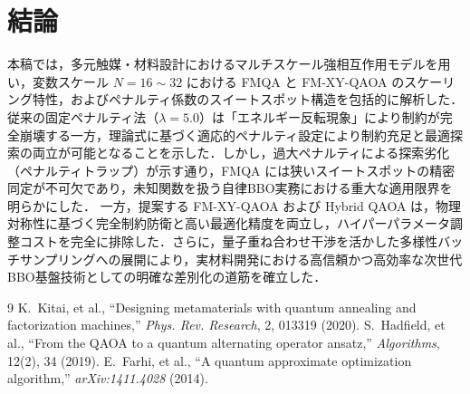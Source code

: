 \documentclass[11pt,a4paper]{ltjsarticle}
\begin{document}
\section{結論}
\label{sec:conclusion}
\vspace{-1mm}
本稿では，多元触媒・材料設計におけるマルチスケール強相互作用モデルを用い，変数スケール $N=16 \sim 32$ における FMQA と FM-XY-QAOA のスケーリング特性，およびペナルティ係数のスイートスポット構造を包括的に解析した．
従来の固定ペナルティ法（$\lambda=5.0$）は「エネルギー反転現象」により制約が完全崩壊する一方，理論式に基づく適応的ペナルティ設定により制約充足と最適探索の両立が可能となることを示した．しかし，過大ペナルティによる探索劣化（ペナルティトラップ）が示す通り，FMQA には狭いスイートスポットの精密同定が不可欠であり，未知関数を扱う自律BBO実務における重大な適用限界を明らかにした．
一方，提案する FM-XY-QAOA および Hybrid QAOA は，物理対称性に基づく完全制約防衛と高い最適化精度を両立し，ハイパーパラメータ調整コストを完全に排除した．さらに，量子重ね合わせ干渉を活かした多様性バッチサンプリングへの展開により，実材料開発における高信頼かつ高効率な次世代BBO基盤技術としての明確な差別化の道筋を確立した．

\vspace{1.5mm}
{\scriptsize
\begin{thebibliography}{9}\setlength{\itemsep}{-2pt}
 K.~Kitai, et al., ``Designing metamaterials with quantum annealing and factorization machines,'' \textit{Phys. Rev. Research}, 2, 013319 (2020).
 S.~Hadfield, et al., ``From the QAOA to a quantum alternating operator ansatz,'' \textit{Algorithms}, 12(2), 34 (2019).
 E.~Farhi, et al., ``A quantum approximate optimization algorithm,'' \textit{arXiv:1411.4028} (2014).
\end{thebibliography}
}
\end{document}
